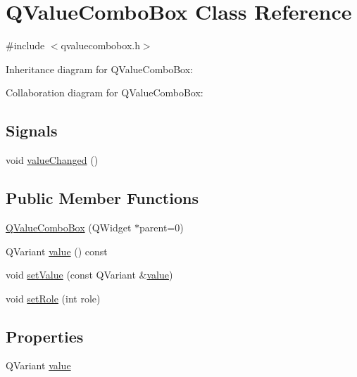 \hypertarget{class_q_value_combo_box}{}\section{Q\+Value\+Combo\+Box Class Reference}
\label{class_q_value_combo_box}


{\ttfamily \#include $<$qvaluecombobox.\+h$>$}



Inheritance diagram for Q\+Value\+Combo\+Box\+:


Collaboration diagram for Q\+Value\+Combo\+Box\+:
\subsection*{Signals}
\begin{DoxyCompactItemize}
\item 
void \hyperlink{class_q_value_combo_box_a0b8f087567544541949baaad9e0626ed}{value\+Changed} ()
\end{DoxyCompactItemize}
\subsection*{Public Member Functions}
\begin{DoxyCompactItemize}
\item 
\hyperlink{class_q_value_combo_box_a7b0b30b9a341440940825a1655dc36dc}{Q\+Value\+Combo\+Box} (Q\+Widget $\ast$parent=0)
\item 
Q\+Variant \hyperlink{class_q_value_combo_box_acc36cf7b65d22fccc52314929cb74303}{value} () const 
\item 
void \hyperlink{class_q_value_combo_box_af192c68c0c82f33000d8c1be8c013d2d}{set\+Value} (const Q\+Variant \&\hyperlink{class_q_value_combo_box_ac487ee6027e1b8b7c211f95d60c45f7c}{value})
\item 
void \hyperlink{class_q_value_combo_box_a9db5bc48951130e1104322de54f55471}{set\+Role} (int role)
\end{DoxyCompactItemize}
\subsection*{Properties}
\begin{DoxyCompactItemize}
\item 
Q\+Variant \hyperlink{class_q_value_combo_box_ac487ee6027e1b8b7c211f95d60c45f7c}{value}
\end{DoxyCompactItemize}


